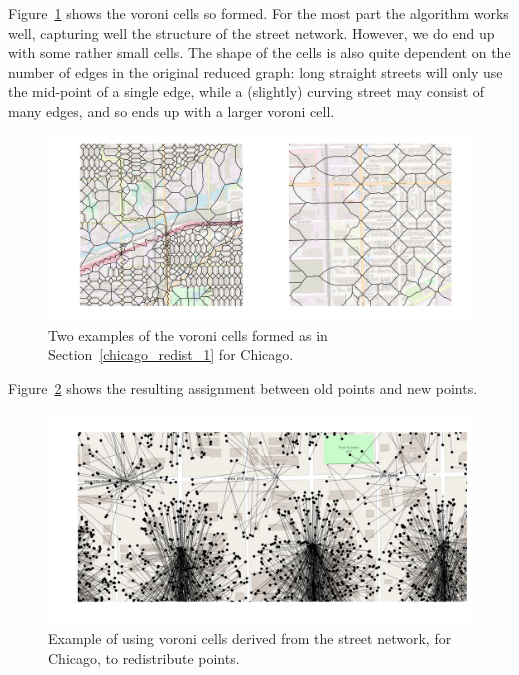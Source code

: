 \documentclass[twoside,a4paper,twocolumn,10pt]{article}
\theoremstyle{plain}
\theoremstyle{definition}
\begin{document}
Figure~\ref{fig:chicago_vor_2} shows the voroni cells so formed.  For the most part the
algorithm works well, capturing well the structure of the street network.  However, we do
end up with some rather small cells.  The shape of the cells is also quite dependent on
the number of edges in the original reduced graph: long straight streets will only use the
mid-point of a single edge, while a (slightly) curving street may consist of many edges, and
so ends up with a larger voroni cell.

\begin{figure}
  \includegraphics[width=\textwidth]{chiago_voroni_street_network_polys.png}
  \caption{Two examples of the voroni cells formed as in Section~\ref{chicago_redist_1} for Chicago.}
  \label{fig:chicago_vor_2}
\end{figure}

Figure~\ref{fig:chicago_vor_1} shows the resulting assignment between old points and
new points.

\begin{figure}
  \includegraphics[width=\textwidth]{chicago_redist_network.png}
  \caption{Example of using voroni cells derived from the street network, for Chicago, to redistribute points.}
  \label{fig:chicago_vor_1}
\end{figure}
\end{document}
